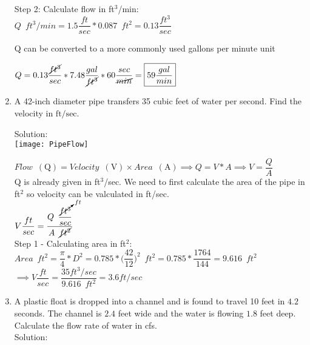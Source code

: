 \begin{enumerate}
Step 2: Calculate flow in ft$^3$/min:\\

$ Q \enspace ft^3/min = 1.5 \dfrac{ft}{sec}*0.087 \enspace ft^2 = 0.13 \dfrac{ft^3}{sec}$\\

\vspace{0.2cm}

Q can be converted to a more commonly used gallons per minute unit

\vspace{0.2cm}

$Q=0.13 \dfrac{\cancel{ft^3}}{sec}*7.48\dfrac{gal}{\cancel{ft^3}}*60\dfrac{sec}{\cancel{min}}=\boxed{59 \dfrac{gal}{min}}$
  

  \item A 42-inch diameter pipe transfers 35 cubic feet of water per second. Find the velocity in $\mathrm{ft} / \mathrm{sec}$. 

  Solution:\\
\vspace{0.3cm}
\texttt{[image: PipeFlow]}\\
\vspace{0.3cm}

$Flow \enspace(\mathrm{Q})= Velocity \enspace(\mathrm{V})  \times Area \enspace(\mathrm{A}) \implies Q=V*A \implies V=\dfrac{Q}{A}$\\
Q is already given in ft${^3}$/sec.  We need to first calculate the area of the pipe in ft${^2}$ so velocity can be valculated in ft/sec.\\
\vspace{0.2cm}
$ V \dfrac{ft}{sec} = \dfrac{Q \enspace \dfrac{\cancelto{ft}{ft^3}}{sec}}{A \enspace\cancel{ft^2}}$\\
\vspace{0.2cm}
Step 1 - Calculating area in ft${^2}$:\\
\vspace{0.2cm}
$Area \enspace ft^2= \dfrac{\pi}{4}*D^2= 0.785*\Big(\dfrac{42}{12}\Big)^2 \enspace ft^2=0.785*\dfrac{1764}{144}=9.616 \enspace ft^2$\\
\vspace{0.2cm}
$\implies V \dfrac{ft}{sec} = \dfrac{ 35 ft^3/sec}{9.616 \enspace ft^2} = \boxed{3.6 ft/sec}$\\
\vspace{0.3cm} 

  
  \item A plastic float is dropped into a channel and is found to travel 10 feet in $4.2$ seconds. The channel is $2.4$ feet wide and the water is flowing $1.8$ feet deep. Calculate the flow rate of water in cfs.\\
  \vspace{0.2cm}
  Solution:\\
  

\end{enumerate}
